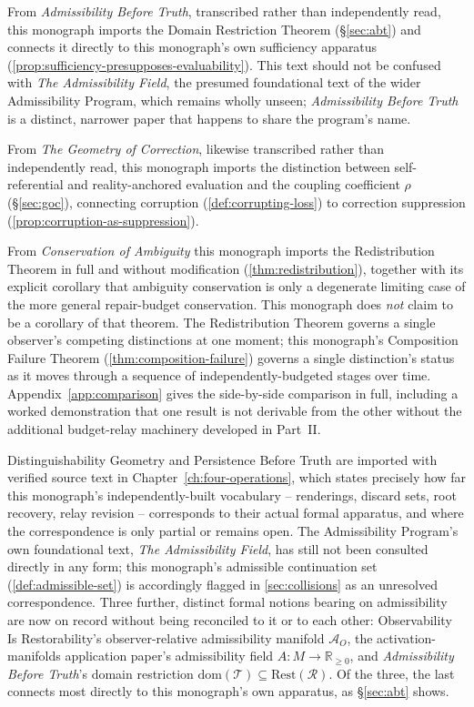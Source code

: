 From \emph{Admissibility Before Truth}, transcribed rather than
independently read, this monograph imports the Domain Restriction
Theorem (\S\ref{sec:abt}) and connects it directly to this monograph's
own sufficiency apparatus (\cref{prop:sufficiency-presupposes-evaluability}).
This text should not be confused with \emph{The Admissibility Field},
the presumed foundational text of the wider Admissibility Program, which
remains wholly unseen; \emph{Admissibility Before Truth} is a distinct,
narrower paper that happens to share the program's name.

From \emph{The Geometry of Correction}, likewise transcribed rather than
independently read, this monograph imports the distinction between
self-referential and reality-anchored evaluation and the coupling
coefficient $\rho$ (\S\ref{sec:goc}), connecting corruption
(\cref{def:corrupting-loss}) to correction suppression
(\cref{prop:corruption-as-suppression}).

From \emph{Conservation of Ambiguity} this monograph imports the
Redistribution Theorem in full and without modification
(\cref{thm:redistribution}), together with its explicit corollary that
ambiguity conservation is only a degenerate limiting case of the more
general repair-budget conservation. This monograph does \emph{not}
claim to be a corollary of that theorem. The Redistribution Theorem
governs a single observer's competing distinctions at one moment; this
monograph's Composition Failure Theorem
(\cref{thm:composition-failure}) governs a single distinction's status
as it moves through a sequence of independently-budgeted stages over
time. Appendix~\ref{app:comparison} gives the side-by-side comparison
in full, including a worked demonstration that one result is not
derivable from the other without the additional budget-relay
machinery developed in Part~II.

Distinguishability Geometry and Persistence Before Truth are imported with
verified source text in Chapter~\ref{ch:four-operations}, which states
precisely how far this monograph's independently-built vocabulary --
renderings, discard sets, root recovery, relay revision -- corresponds to
their actual formal apparatus, and where the correspondence is only
partial or remains open. The Admissibility Program's own foundational
text, \emph{The Admissibility Field}, has still not been consulted
directly in any form; this monograph's admissible continuation set
(\cref{def:admissible-set}) is accordingly flagged in
\cref{sec:collisions} as an unresolved correspondence. Three further,
distinct formal notions bearing on admissibility are now on record
without being reconciled to it or to each other: Observability Is
Restorability's observer-relative admissibility manifold $\mathcal{A}_O$,
the activation-manifolds application paper's admissibility field
$A: M \to \mathbb{R}_{\ge 0}$, and \emph{Admissibility Before Truth}'s
domain restriction $\mathrm{dom}(\mathcal{T}) \subseteq \mathrm{Rest}(\mathcal{R})$.
Of the three, the last connects most directly to this monograph's own
apparatus, as \S\ref{sec:abt} shows.
